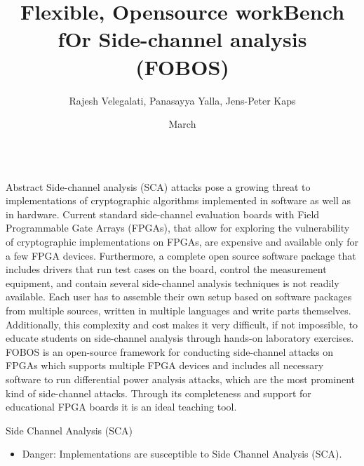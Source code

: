 \documentclass[final]{beamer}
\title{\LARGE Flexible, Opensource workBench fOr Side-channel analysis\\ \vspace{0.5ex}(FOBOS)}
\author{Rajesh Velegalati, Panasayya Yalla, Jens-Peter Kaps}%
\institute{\vspace{-1ex}Department of Electrical and Computer Engineering, George Mason University, Fairfax, Virginia 22030, USA
          } %
\date{March}
\begin{document}
\begin{frame}[fragile]{} 
  \begin{columns}[t]
    \begin{column}{.31\linewidth}

      \begin{block}{Abstract}
Side-channel analysis (SCA) attacks pose a growing threat to implementations of cryptographic 
algorithms implemented in software as well as in hardware. Current standard 
side-channel evaluation boards with Field Programmable Gate Arrays (FPGAs), that allow 
for exploring the vulnerability of cryptographic implementations on FPGAs, are expensive
and available only for a few FPGA devices. Furthermore, a complete open source 
software package that includes drivers that run test cases on the board, 
control the measurement equipment, and contain several side-channel analysis 
techniques is not readily available. Each user has to assemble their own setup
based on software packages from multiple sources, written in multiple languages
and write parts themselves. Additionally, this complexity and cost makes it very difficult,
if not impossible, to educate students on side-channel analysis
through hands-on laboratory exercises. 
FOBOS is an open-source framework for conducting side-channel attacks on FPGAs
which supports multiple FPGA devices and includes all necessary software to run 
differential power analysis attacks, which are the most prominent kind of side-channel attacks. 
Through its completeness and support for educational FPGA boards it is an ideal 
teaching tool.
      \end{block}
	 

      \begin{block}{Side Channel Analysis (SCA)}
        \begin{itemize}
          \item {\color{red}Danger:} Implementations are susceptible to Side Channel Analysis (SCA).
        \end{itemize}


\end{block}
\end{column}
\end{columns}
\end{frame}
\end{document}
